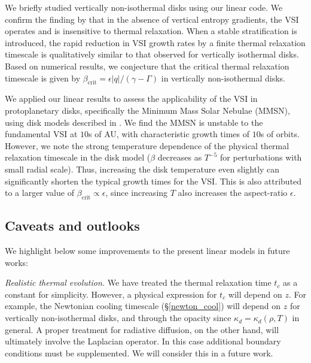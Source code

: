 We briefly studied vertically non-isothermal disks using our linear 
code. We confirm the finding by \cite{nelson13} that in the absence
of vertical entropy gradients, the VSI operates and is insensitive to
thermal relaxation. When a stable stratification is introduced, the
rapid reduction in VSI growth rates by a finite thermal relaxation
timescale is qualitatively similar to that observed for vertically
isothermal disks. Based on numerical results, we conjecture that the
critical thermal relaxation timescale is given by
$\beta_\mathrm{crit}=\epsilon|q|/(\gamma-\Gamma)$ in vertically 
non-isothermal disks.  


We applied our linear results to assess the applicability of the VSI in
protoplanetary disks, specifically the Minimum Mass Solar Nebulae (MMSN),
using disk models described in \cite{chiang10}. We find the MMSN is
unstable to the fundamental VSI at $10$s of AU, with characteristic
growth times of $10$s of orbits. However, we note the strong
temperature dependence of the physical thermal relaxation timescale
in the disk model ($\beta$ decreases as $T^{-5}$ for perturbations with small
radial scale). Thus, increasing the disk temperature even slightly can significantly 
shorten the typical growth times for the VSI. This is also attributed
to a larger value of $\beta_\mathrm{crit}\propto\epsilon$, since increasing $T$ also
increases the aspect-ratio $\epsilon$. 




\subsection{Caveats and outlooks} 
We highlight below some improvements to the present  
linear models in future works:  

\emph{Realistic thermal evolution.} We have treated the thermal
relaxation time $t_c$ as a constant for simplicity. However, a
physical expression for $t_c$ will depend on 
$z$. For example, the Newtonian cooling timescale
(\S\ref{newton_cool}) will depend on $z$ for vertically non-isothermal
disks, and through the opacity since 
$\kappa_d=\kappa_d(\rho,T)$ in general. 
A proper treatment for radiative diffusion, on the other hand, will
ultimately involve the Laplacian operator. In this case additional
boundary conditions must be supplemented. We will consider this in a
future work.  



